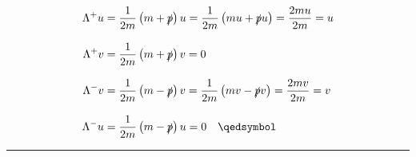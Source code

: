 \begin{solution}
\begin{enumerate}[label=(\alph*)]
        \begin{align*}
            \Lambda^+ u &= \frac{1}{2m} \left(m+\pslash\right) u = \frac{1}{2m} \left(mu+\pslash u\right) = \frac{2mu}{2m} = u \\[0.12in]
            \Lambda^+ v &= \frac{1}{2m} \left(m+\pslash\right) v =0  \\[0.12in]
            \Lambda^- v &= \frac{1}{2m} \left(m-\pslash\right) v = \frac{1}{2m} \left(mv-\pslash v\right) = \frac{2mv}{2m} = v \\[0.12in]
            \Lambda^- u &= \frac{1}{2m} \left(m-\pslash\right) u =0 \qed
        \end{align*}
    \end{enumerate}
\end{solution}

\noindent\rule{7in}{1.5pt}


